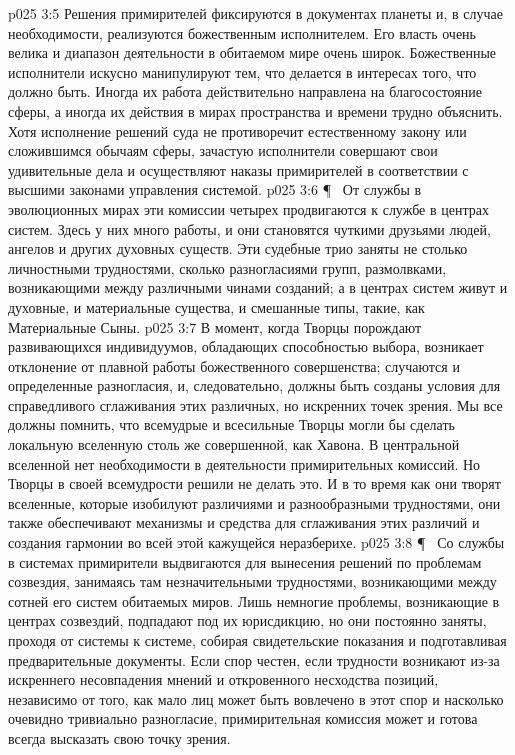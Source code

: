 \vs p025 3:5 Решения примирителей фиксируются в документах планеты и, в случае необходимости, реализуются божественным исполнителем. Его власть очень велика и диапазон деятельности в обитаемом мире очень широк. Божественные исполнители искусно манипулируют тем, что делается в интересах того, что должно быть. Иногда их работа действительно направлена на благосостояние сферы, а иногда их действия в мирах пространства и времени трудно объяснить. Хотя исполнение решений суда не противоречит естественному закону или сложившимся обычаям сферы, зачастую исполнители совершают свои удивительные дела и осуществляют наказы примирителей в соответствии с высшими законами управления системой.
\vs p025 3:6 \P\ \bibnobreakspace {} От службы в эволюционных мирах эти комиссии четырех продвигаются к службе в центрах систем. Здесь у них много работы, и они становятся чуткими друзьями людей, ангелов и других духовных существ. Эти судебные трио заняты не столько личностными трудностями, сколько разногласиями групп, размолвками, возникающими между различными чинами созданий; а в центрах систем живут и духовные, и материальные существа, и смешанные типы, такие, как Материальные Сыны.
\vs p025 3:7 В момент, когда Творцы порождают развивающихся индивидуумов, обладающих способностью выбора, возникает отклонение от плавной работы божественного совершенства; случаются и определенные разногласия, и, следовательно, должны быть созданы условия для справедливого сглаживания этих различных, но искренних точек зрения. Мы все должны помнить, что всемудрые и всесильные Творцы могли бы сделать локальную вселенную столь же совершенной, как Хавона. В центральной вселенной нет необходимости в деятельности примирительных комиссий. Но Творцы в своей всемудрости решили не делать это. И в то время как они творят вселенные, которые изобилуют различиями и разнообразными трудностями, они также обеспечивают механизмы и средства для сглаживания этих различий и создания гармонии во всей этой кажущейся неразберихе.
\vs p025 3:8 \P\ \bibnobreakspace {} Со службы в системах примирители выдвигаются для вынесения решений по проблемам созвездия, занимаясь там незначительными трудностями, возникающими между сотней его систем обитаемых миров. Лишь немногие проблемы, возникающие в центрах созвездий, подпадают под их юрисдикцию, но они постоянно заняты, проходя от системы к системе, собирая свидетельские показания и подготавливая предварительные документы. Если спор честен, если трудности возникают из\hyp{}за искреннего несовпадения мнений и откровенного несходства позиций, независимо от того, как мало лиц может быть вовлечено в этот спор и насколько очевидно тривиально разногласие, примирительная комиссия может и готова всегда высказать свою точку зрения.
